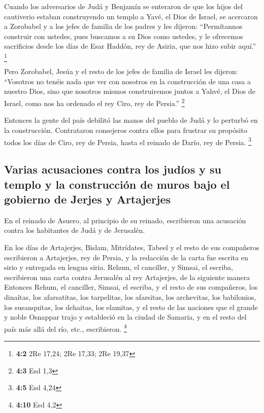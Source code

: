 \begin{paracol}{2}
 Cuando los adversarios de Judá y Benjamín se enteraron de
que los hijos del cautiverio estaban construyendo un templo a Yavé, el
Dios de Israel,  se acercaron a Zorobabel y a los jefes de
familia de los padres y les dijeron: ``Permítannos construir con
ustedes, pues buscamos a su Dios como ustedes, y le ofrecemos
sacrificios desde los días de Esar Haddón, rey de Asiria, que nos hizo
subir aquí.'' \footnote{\textbf{4:2} 2Re 17,24; 2Re 17,33; 2Re 19,37}

 Pero Zorobabel, Jesúa y el resto de los jefes de familia
de Israel les dijeron: ``Vosotros no tenéis nada que ver con nosotros en
la construcción de una casa a nuestro Dios, sino que nosotros mismos
construiremos juntos a Yahvé, el Dios de Israel, como nos ha ordenado el
rey Ciro, rey de Persia.'' \footnote{\textbf{4:3} Esd 1,3}

 Entonces la gente del país debilitó las manos del pueblo
de Judá y lo perturbó en la construcción.  Contrataron
consejeros contra ellos para frustrar su propósito todos los días de
Ciro, rey de Persia, hasta el reinado de Darío, rey de Persia.
\footnote{\textbf{4:5} Esd 4,24}

\hypertarget{varias-acusaciones-contra-los-juduxedos-y-su-templo-y-la-construcciuxf3n-de-muros-bajo-el-gobierno-de-jerjes-y-artajerjes}{%
\subsection{Varias acusaciones contra los judíos y su templo y la
construcción de muros bajo el gobierno de Jerjes y
Artajerjes}\label{varias-acusaciones-contra-los-juduxedos-y-su-templo-y-la-construcciuxf3n-de-muros-bajo-el-gobierno-de-jerjes-y-artajerjes}}

 En el reinado de Asuero, al principio de su reinado,
escribieron una acusación contra los habitantes de Judá y de Jerusalén.

 En los días de Artajerjes, Bislam, Mitrídates, Tabeel y
el resto de sus compañeros escribieron a Artajerjes, rey de Persia, y la
redacción de la carta fue escrita en sirio y entregada en lengua siria.
 Rehum, el canciller, y Simsai, el escriba, escribieron
una carta contra Jerusalén al rey Artajerjes, de la siguiente manera
 Entonces Rehum, el canciller, Simsai, el escriba, y el
resto de sus compañeros, los dinaítas, los afarsatitas, los tarpelitas,
los afarsitas, los archevitas, los babilonios, los susanquitas, los
dehaitas, los elamitas,  y el resto de las naciones que
el grande y noble Osnappar trajo y estableció en la ciudad de Samaria, y
en el resto del país más allá del río, etc., escribieron. \footnote{\textbf{4:10}
  Esd 4,2}


\end{paracol}
